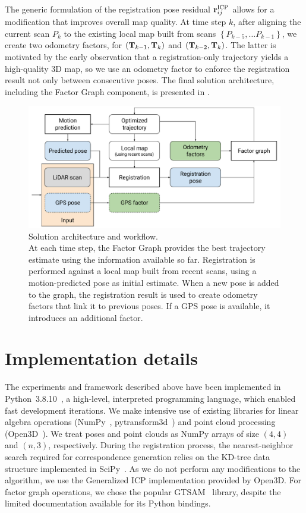 The generic formulation of the registration pose residual $\mathbf{r}_{ij}^{\text{ICP}}$ allows for a modification that improves overall map quality. At time step $k$, after aligning the current scan $P_k$ to the existing local map built from scans $\left\{P_{k-5}, \dots P_{k-1}\right\}$, we create two odometry factors, for $\left(\mathbf{T}_{k-1},\mathbf{T}_k\right)$ and $\left(\mathbf{T}_{k-2},\mathbf{T}_k\right)$. The latter is motivated by the early observation that a registration-only trajectory yields a high-quality 3D map, so we use an odometry factor to enforce the registration result not only between consecutive poses.
The final solution architecture, including the Factor Graph component, is presented in .
\begin{figure}[h]
	\centering
	\includegraphics[width=0.7\linewidth]{images/solution-diagram.pdf}
	\caption[Solution Architecture]{Solution architecture and workflow.\\At each time step, the Factor Graph provides the best trajectory estimate using the information available so far. Registration is performed against a local map built from recent scans, using a motion-predicted pose as initial estimate. When a new pose is added to the graph, the registration result is used to create odometry factors that link it to previous poses. If a GPS pose is available, it introduces an additional factor.}
	\label{fig:solution-architecture}
\end{figure}

\section{Implementation details}

The experiments and framework described above have been implemented in \mbox{Python 3.8.10}~\cite{Python}, a high-level, interpreted programming language, which enabled fast development iterations.
We make intensive use of existing libraries for linear algebra operations (NumPy~\cite{harris2020array}, pytransform3d~\cite{Fabisch2019}) and point cloud processing (Open3D~\cite{Zhou2018}). We treat poses and point clouds as NumPy arrays of size $(4, 4)$ and $(n, 3)$, respectively. During the registration process, the nearest-neighbor search required for correspondence generation relies on the KD-tree data structure implemented in SciPy~\cite{2020SciPy-NMeth}. As we do not perform any modifications to the algorithm, we use the Generalized ICP implementation provided by Open3D. For factor graph operations, we chose the popular GTSAM~\cite{gtsam} library, despite the limited documentation available for its Python bindings.

